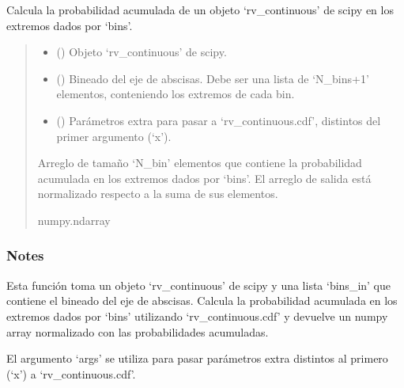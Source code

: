 \documentclass[letterpaper,10pt,english]{sphinxmanual}
\begin{document}
\begin{fulllineitems}
\label{\detokenize{utils.stats:utils.stats.bin_rv_cont}}
\pysigstartsignatures
{}
\pysigstopsignatures
\sphinxAtStartPar
Calcula la probabilidad acumulada de un objeto ‘rv\_continuous’ de scipy en los extremos dados por ‘bins’.
\begin{quote}\begin{description}
\begin{itemize}
\item {} 
\sphinxAtStartPar
{} () \textendash{} Objeto ‘rv\_continuous’ de scipy.

\item {} 
\sphinxAtStartPar
{} () \textendash{} Bineado del eje de abscisas. Debe ser una lista de ‘N\_bins+1’ elementos, conteniendo los extremos de cada bin.

\item {} 
\sphinxAtStartPar
{} (\sphinxstyleliteralemphasis{\sphinxupquote{, }}) \textendash{} Parámetros extra para pasar a ‘rv\_continuous.cdf’, distintos del primer argumento (‘x’).

\end{itemize}

\sphinxAtStartPar
Arreglo de tamaño ‘N\_bin’ elementos que contiene la probabilidad acumulada en los extremos dados por ‘bins’.
El arreglo de salida está normalizado respecto a la suma de sus elementos.

\sphinxAtStartPar
numpy.ndarray

\end{description}\end{quote}
\subsubsection*{Notes}

\sphinxAtStartPar
Esta función toma un objeto ‘rv\_continuous’ de scipy y una lista ‘bins\_in’ que contiene el bineado del eje de abscisas.
Calcula la probabilidad acumulada en los extremos dados por ‘bins’ utilizando ‘rv\_continuous.cdf’ y devuelve un numpy array
normalizado con las probabilidades acumuladas.

\sphinxAtStartPar
El argumento ‘args’ se utiliza para pasar parámetros extra distintos al primero (‘x’) a ‘rv\_continuous.cdf’.

\end{fulllineitems}
\end{document}
